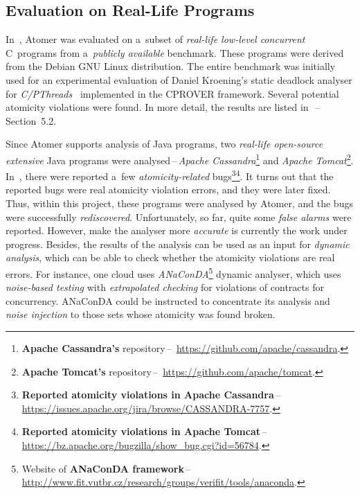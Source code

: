 \subsection{Evaluation on Real-Life Programs}
\label{sec:expReal}

In~\cite{harmimBP}, Atomer was evaluated on a~subset of \emph{real-life
low-level concurrent} C~programs from a~\emph{publicly available} benchmark.
These programs were derived from the Debian GNU Linux distribution. The entire
benchmark was initially used for an experimental evaluation of Daniel
Kroening's static deadlock analyser for
\emph{C/PThreads}~\cite{deadlockKroening} implemented in the CPROVER framework.
Several potential atomicity violations were found. In more detail, the results
are listed in~\cite{harmimBP}\,--\,Section~5.2.

Since Atomer supports analysis of Java programs, two \emph{real-life open-source
extensive} Java programs \linebreak were analysed\,--\,\emph{Apache
Cassandra}\footnote{\textbf{Apache Cassandra's} repository\,--\,%
\url{https://github.com/apache/cassandra}.} and \emph{Apache
Tomcat}\footnote{\textbf{Apache Tomcat's} repository\,--\,%
\url{https://github.com/apache/tomcat}.}. In~\cite{contracts2015,
contracts2017}, there were reported a~few \emph{atomicity-related}
bugs\footnote{\textbf{Reported atomicity violations in Apache Cassandra}\,--\,%
\url{https://issues.apache.org/jira/browse/CASSANDRA-7757}.}\footnote{\textbf{%
Reported atomicity violations in Apache Tomcat}\,--\,%
\url{https://bz.apache.org/bugzilla/show_bug.cgi?id=56784}.}. It turns out that
the reported bugs were real atomicity violation errors, and they were later
fixed. Thus, within this project, these programs were analysed by Atomer, and
the bugs were successfully \emph{rediscovered}. Unfortunately, so far, quite
some \emph{false alarms} were reported. However, make the analyser more
\emph{accurate} is currently the work under progress. Besides, the results
of the analysis can be used as an input for \emph{dynamic analysis}, which
can be able to check whether the atomicity violations are real errors. For
instance, one cloud uses \emph{ANaConDA}\footnote{Website of \textbf{ANaConDA
framework}\,--\,%
\url{http://www.fit.vutbr.cz/research/groups/verifit/tools/anaconda}.} dynamic
analyser, which uses \emph{noise-based testing} with \emph{extrapolated
checking} for violations of contracts for concurrency. ANaConDA could be
instructed to concentrate its analysis and \emph{noise injection} to those
sets whose atomicity was found broken.

